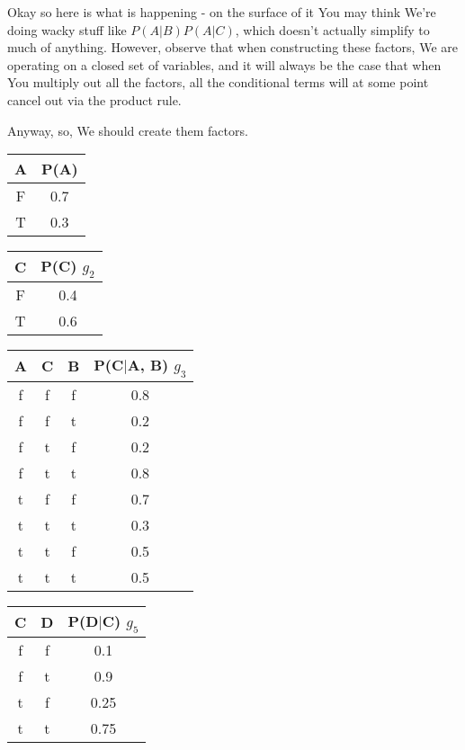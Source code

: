 \documentclass{article}
\begin{document}
			Okay so here is what is happening - on the surface of it You may think We're doing wacky stuff like $P(A|B)P(A|C)$, which doesn't actually simplify to much of anything. However, observe that when constructing these factors, We are operating on a closed set of variables, and it will always be the case that when You multiply out all the factors, all the conditional terms will at some point cancel out via the product rule.
			
			Anyway, so, We should create them factors.
			
			\begin{center}
				\begin{tabular}{ |c|c| } 
					\hline
					A & P(A) \\
					\hline 
					F & 0.7 \\ 
					T & 0.3 \\ 
					\hline
				\end{tabular}
			\end{center}
			
			
			\begin{center}
				\begin{tabular}{ |c|c|  } 
					\hline
					C & P(C) $g_2$\\
					\hline 
					F & 0.4 \\ 
					T & 0.6 \\ 
					\hline
				\end{tabular}
			\end{center}

			
			\begin{center}
				\begin{tabular}{ |c|c|c|c|  } 
					\hline
					A& C& B & P(C$|$A, B) $g_3$\\
					\hline 
					f & f & f & 0.8 \\
					f & f & t & 0.2 \\
					f & t & f & 0.2 \\
					f & t & t & 0.8 \\
					t & f & f & 0.7 \\
					t & t & t & 0.3 \\
					t & t & f & 0.5 \\
					t & t & t & 0.5 \\ 
					\hline
				\end{tabular}
			\end{center}
			
			
			\begin{center}
				\begin{tabular}{ |c|c|c|  } 
					\hline
					C & D & P(D$|$C) $g_5$ \\
					\hline 
					f & f & 0.1 \\
					f & t & 0.9 \\
					t & f & 0.25\\
					t & t & 0.75 \\ 
					\hline
				\end{tabular}
			\end{center}
\end{document}
